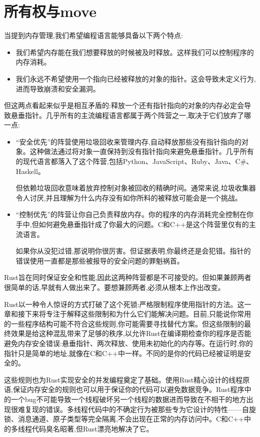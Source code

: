\chapter{所有权与move}\label{ch04}

当提到内存管理,我们希望编程语言能够具备以下两个特点:
\begin{itemize}
    \item 我们希望内存能在我们想要释放的时候被及时释放。这样我们可以控制程序的内存消耗。
    \item 我们永远不希望使用一个指向已经被释放的对象的指针。这会导致未定义行为,进而导致崩溃和安全漏洞。
\end{itemize}

但这两点看起来似乎是相互矛盾的:释放一个还有指针指向的对象的内存必定会导致悬垂指针。几乎所有的主流编程语言都属于两个阵营之一,取决于它们放弃了哪一点:
\begin{itemize}
    \item “安全优先”的阵营使用垃圾回收来管理内存,自动释放那些没有指针指向的对象。这种做法通过将对象一直保持到没有指针指向来避免悬垂指针。几乎所有的现代语言都落入了这个阵营,包括Python、JavaScript、Ruby、Java、C\#、Haskell。

    但依赖垃圾回收意味着放弃控制对象被回收的精确时间。通常来说,垃圾收集器令人讨厌,并且理解为什么内存没有如你所料的被释放可能会是一个挑战。

    \item “控制优先”的阵营让你自己负责释放内存。你的程序的内存消耗完全控制在你手中,但如何避免悬垂指针成了你最大的问题。C和C++是这个阵营里仅有的主流语言。

    如果你从没犯过错,那说明你很厉害。但证据表明,你最终还是会犯错。指针的错误使用一直都是那些被报导的安全问题的罪魁祸首。
\end{itemize}

Rust旨在同时保证安全和性能,因此这两种阵营都是不可接受的。但如果兼顾两者很简单的话,早就有人做出来了。要想兼顾两者,必须从根本上作出改变。

Rust以一种令人惊讶的方式打破了这个死锁:严格限制程序使用指针的方法。这一章和接下来将专注于解释这些限制和为什么它们能解决问题。目前,只能说你常用的一些程序结构可能不符合这些规则,你可能需要寻找替代方案。但这些限制的最终效果是给这种混乱带来了足够的秩序,以允许Rust在编译期检查你的程序是否能避免内存安全错误:悬垂指针、两次释放、使用未初始化的内存等。在运行时,你的指针只是简单的地址,就像在C和C++中一样。不同的是你的代码已经被证明是安全的。

这些规则也为Rust实现安全的并发编程奠定了基础。使用Rust精心设计的线程原语,保证内存安全的规则也可以用于保证你的代码可以避免数据竞争。Rust程序中的一个bug不可能导致一个线程破坏另一个线程的数据进而导致在不相干的地方出现很难复现的错误。多线程代码中的不确定行为被那些专为它设计的特性——自旋锁、消息通道、原子类型等完全隔离,不会出现在正常的内存访问中。C和C++中的多线程代码臭名昭著,但Rust漂亮地解决了它。

